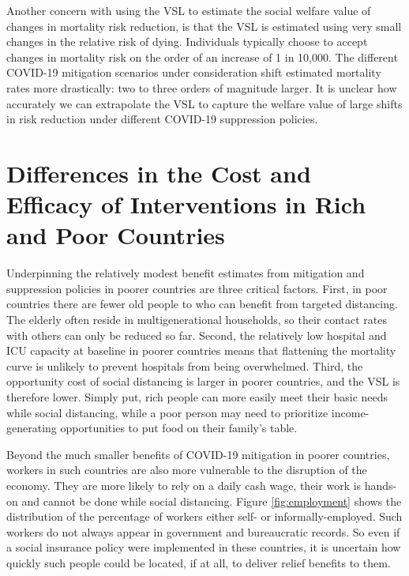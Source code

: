\documentclass[11pt]{article}
\begin{document}
Another concern with using the VSL to estimate the social welfare value of changes in mortality risk reduction, is that the VSL is estimated using very small changes in the relative risk of dying. Individuals typically choose to accept changes in mortality risk on the order of an increase of 1 in 10,000. The different COVID-19 mitigation scenarios under consideration shift estimated mortality rates more drastically: two to three orders of magnitude larger. %
It is unclear how accurately we can extrapolate the VSL to capture the welfare value of large shifts in risk reduction under different COVID-19 suppression policies.

\section{Differences in the Cost and Efficacy of Interventions in Rich and Poor Countries}

Underpinning the relatively modest benefit estimates from mitigation and suppression policies in poorer countries are three critical factors. First, in poor countries there are fewer old people to who can benefit from targeted distancing. The elderly often reside in multigenerational households, so their contact rates with others can only be reduced so far. Second, the relatively low hospital and ICU capacity at baseline in poorer countries means that flattening the mortality curve is unlikely to prevent hospitals from being overwhelmed. Third, the opportunity cost of social distancing is larger in poorer countries, and the VSL is therefore lower. Simply put, rich people can more easily meet their basic needs while social distancing, while a poor person may need to prioritize income-generating opportunities to put food on their family's table.

Beyond the much smaller benefits of COVID-19 mitigation in poorer countries, workers in such countries are also more vulnerable to the disruption of the economy. They are more likely to rely on a daily cash wage, their work is hands-on and cannot be done while social distancing. Figure \ref{fig:employment} shows the distribution of the percentage of workers either self- or informally-employed. Such workers do not always appear in government and bureaucratic records. So even if a social insurance policy were implemented in these countries, it is uncertain how quickly such people could be located, if at all, to deliver relief benefits to them.
\end{document}
